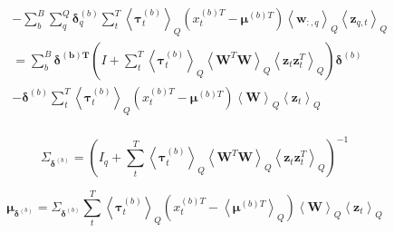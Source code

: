 \documentclass[10pt]{article}
\newcommand{\Angle}[1]{\left \langle #1 \right \rangle}
\newcommand{\Eq}[1]{\Angle{#1}_Q}
\begin{document}
\begin{align}
        & - \sum_b^B\sum_q^Q\bm{\delta}_q^{(b)}\sum_t^T\Eq{\bm{\tau}_t^{(b)}}(x_t^{(b)T} - \bm{\mu}^{(b)T})\Eq{\bm{w}_{:,q}}\Eq{\bm{z}_{q,t}} \nonumber \\
        & = \sum_b^B\bm{\delta^{(b)T}}(I + \sum_t^T\Eq{\bm{\tau}_t^{(b)}}\Eq{\bm{W}^T\bm{W}}\Eq{\bm{z}_t\bm{z}_t^T})\bm{\delta}^{(b)} \nonumber \\
        & - \bm{\delta}^{(b)}\sum_t^T\Eq{\bm{\tau}_t^{(b)}}(x_t^{(b)T} - \bm{\mu}^{(b)T})\Eq{\bm{W}}\Eq{\bm{z}_t} \nonumber \\
    \end{align}

    \begin{equation}
        \Sigma_{\bm{\delta}^{(b)}} = (I_q + \sum_t^T\Eq{\bm{\tau}_t^{(b)}}\Eq{\bm{W}^T\bm{W}}\Eq{\bm{z}_t\bm{z}_t^T})^{-1}
    \end{equation}

    \begin{equation}
        \bm{\mu}_{\bm{\delta}^{(b)}} = \Sigma_{\bm{\delta}^{(b)}} \sum_t^T\Eq{\bm{\tau}_t^{(b)}}(x_t^{(b)T} - \Eq{\bm{\mu}^{(b)T}})\Eq{\bm{W}}\Eq{\bm{z}_t}
    \end{equation}
\end{document}
